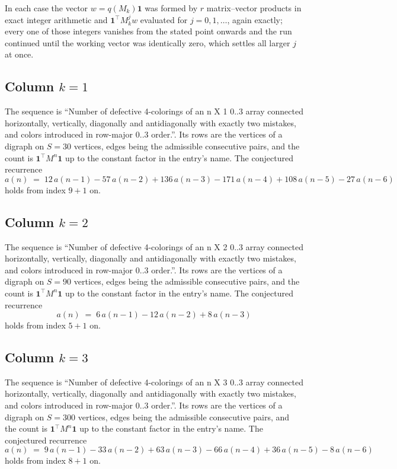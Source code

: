 \documentclass[11pt,a4paper]{article}
\theoremstyle{plain}
\theoremstyle{definition}
\begin{document}
In each case the vector $w=q(M_k)\mathbf{1}$ was formed by $r$ matrix--vector products in
exact integer arithmetic and $\mathbf{1}^{\!\top}M_k^{j}w$ evaluated for $j=0,1,\dots$,
again exactly; every one of those integers vanishes from the stated point onwards and the run
continued until the working vector was identically zero, which settles all larger $j$ at once.

\subsection*{Column $k$$=1$}
The sequence is ``Number of defective 4-colorings of an n X 1 0..3 array connected horizontally, vertically, diagonally and antidiagonally with exactly two mistakes, and colors introduced in row-major 0..3 order.''. Its rows are the vertices of a digraph on
$S=30$ vertices, edges being the admissible consecutive pairs, and the count is
$\mathbf{1}^{\!\top}M^{n}\mathbf{1}$ up to the constant factor in the entry's name.
The conjectured recurrence
\[
a(n)\;=\;12\,a(n-1) - 57\,a(n-2) + 136\,a(n-3) - 171\,a(n-4) + 108\,a(n-5) - 27\,a(n-6)
\]
holds from index $9+1$ on.

\subsection*{Column $k$$=2$}
The sequence is ``Number of defective 4-colorings of an n X 2 0..3 array connected horizontally, vertically, diagonally and antidiagonally with exactly two mistakes, and colors introduced in row-major 0..3 order.''. Its rows are the vertices of a digraph on
$S=90$ vertices, edges being the admissible consecutive pairs, and the count is
$\mathbf{1}^{\!\top}M^{n}\mathbf{1}$ up to the constant factor in the entry's name.
The conjectured recurrence
\[
a(n)\;=\;6\,a(n-1) - 12\,a(n-2) + 8\,a(n-3)
\]
holds from index $5+1$ on.

\subsection*{Column $k$$=3$}
The sequence is ``Number of defective 4-colorings of an n X 3 0..3 array connected horizontally, vertically, diagonally and antidiagonally with exactly two mistakes, and colors introduced in row-major 0..3 order.''. Its rows are the vertices of a digraph on
$S=300$ vertices, edges being the admissible consecutive pairs, and the count is
$\mathbf{1}^{\!\top}M^{n}\mathbf{1}$ up to the constant factor in the entry's name.
The conjectured recurrence
\[
a(n)\;=\;9\,a(n-1) - 33\,a(n-2) + 63\,a(n-3) - 66\,a(n-4) + 36\,a(n-5) - 8\,a(n-6)
\]
holds from index $8+1$ on.
\end{document}
